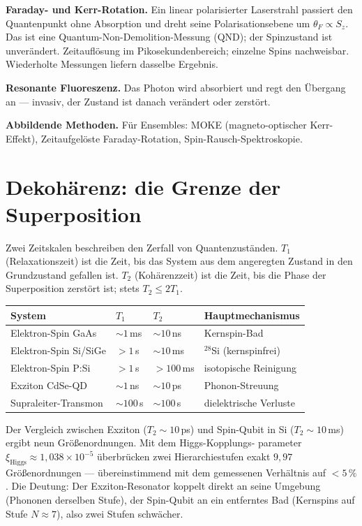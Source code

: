 \textbf{Faraday- und Kerr-Rotation.} Ein linear polarisierter
Laserstrahl passiert den Quantenpunkt ohne Absorption und dreht seine
Polarisationsebene um $\theta_F\propto S_z$. Das ist eine
Quantum-Non-Demolition-Messung (QND); der Spinzustand ist unverändert.
Zeitauflösung im Pikosekundenbereich; einzelne Spins nachweisbar.
Wiederholte Messungen liefern dasselbe Ergebnis.

\textbf{Resonante Fluoreszenz.} Das Photon wird absorbiert und regt den
Übergang an --- invasiv, der Zustand ist danach verändert oder zerstört.

\textbf{Abbildende Methoden.} Für Ensembles: MOKE (magneto-optischer
Kerr-Effekt), Zeitaufgelöste Faraday-Rotation, Spin-Rausch-Spektroskopie.

\section{Dekohärenz: die Grenze der Superposition}

Zwei Zeitskalen beschreiben den Zerfall von Quantenzuständen.
$T_1$ (Relaxationszeit) ist die Zeit, bis das System aus dem angeregten
Zustand in den Grundzustand gefallen ist. $T_2$ (Kohärenzzeit) ist die
Zeit, bis die Phase der Superposition zerstört ist; stets $T_2\le2T_1$.

\begin{center}
\small
\begin{tabular}{p{3.2cm}p{1.3cm}p{1.3cm}p{3.3cm}}
\toprule
\textbf{System} & \textbf{$T_1$} & \textbf{$T_2$} & \textbf{Hauptmechanismus} \\
\midrule
Elektron-Spin GaAs & $\sim1$\,ms & $\sim10$\,ns & Kernspin-Bad \\
Elektron-Spin Si/SiGe & $>1$\,s & $\sim10$\,ms & ${}^{28}$Si (kernspinfrei) \\
Elektron-Spin P:Si & $>1$\,s & $>100$\,ms & isotopische Reinigung \\
Exziton CdSe-QD & $\sim1$\,ns & $\sim10$\,ps & Phonon-Streuung \\
Supraleiter-Transmon & $\sim100$\,\textmu{}s & $\sim100$\,\textmu{}s & dielektrische Verluste \\
\bottomrule
\end{tabular}
\end{center}

Der Vergleich zwischen Exziton ($T_2\sim10$\,ps) und Spin-Qubit in Si
($T_2\sim10$\,ms) ergibt neun Größenordnungen. Mit dem Higgs-Kopplungs-
parameter $\xi_{\mathrm{Higgs}}\approx1{,}038\times10^{-5}$ überbrücken
zwei Hierarchiestufen exakt $9{,}97$ Größenordnungen --- übereinstimmend
mit dem gemessenen Verhältnis auf $<5\,\%$. Die Deutung: Der
Exziton-Resonator koppelt direkt an seine Umgebung (Phononen derselben
Stufe), der Spin-Qubit an ein entferntes Bad (Kernspins auf Stufe
$N\approx7$), also zwei Stufen schwächer.

